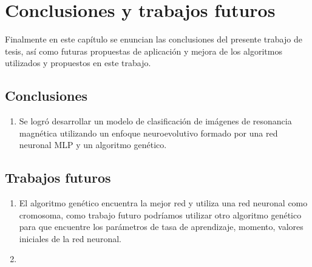 \chapter{Conclusiones y trabajos futuros}

Finalmente en este capítulo se enuncian las conclusiones del presente trabajo de tesis, así como futuras propuestas de aplicación y mejora de los algoritmos utilizados y propuestos en este trabajo.
\label{chap:conclusiones}
\section*{Conclusiones}
\begin{enumerate}
\item Se logró desarrollar un modelo de clasificación de imágenes de resonancia magnética utilizando un enfoque neuroevolutivo formado por una red neuronal MLP y un algoritmo genético.\end{enumerate}
\section*{Trabajos futuros}
\begin{enumerate}
\item El algoritmo genético encuentra la mejor red y utiliza una red neuronal como cromosoma, como trabajo futuro podríamos utilizar otro algoritmo genético para que encuentre los parámetros de tasa de aprendizaje, momento, valores iniciales de la red neuronal.
\item \end{enumerate}